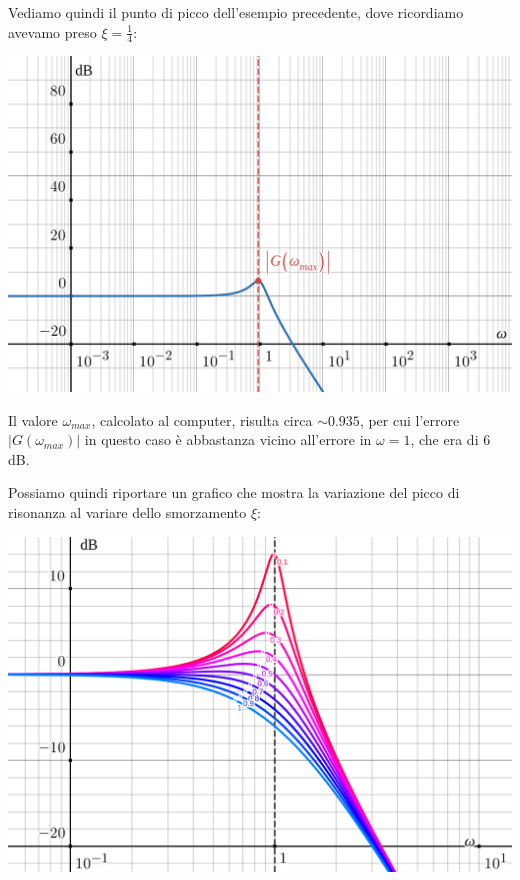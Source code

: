 \documentclass[a4paper,11pt]{article}
\begin{document}
\par\bigskip

\noindent
\begin{minipage}{\textwidth}
Vediamo quindi il punto di picco dell'esempio precedente, dove ricordiamo avevamo preso $\xi = \frac{1}{4}$:

\begin{center}
	\includegraphics[scale=0.3]{../figures/order2_bode/peak_point.png}
\end{center}
\end{minipage}

\par\bigskip

Il valore $\omega_{max}$, calcolato al computer, risulta circa $\sim 0.935$, per cui l'errore $\left| G \left( \omega_{max} \right) \right|$ in questo caso è abbastanza vicino all'errore in $\omega = 1$, che era di 6 dB.

\par\bigskip

\noindent
\begin{minipage}{\textwidth}
Possiamo quindi riportare un grafico che mostra la variazione del picco di risonanza al variare dello smorzamento $\xi$:

\begin{center}
	\includegraphics[scale=0.3]{../figures/order2_bode/peak_plot.png}
\end{center}
\end{minipage}
\end{document}
